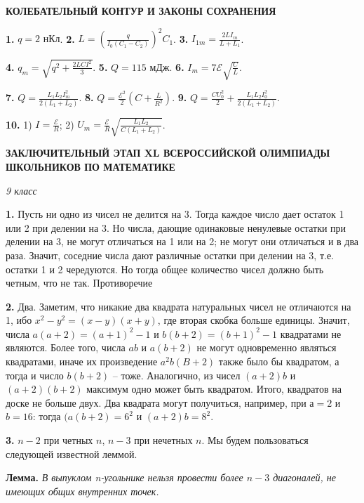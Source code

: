\begin{multicols}{2}
\begin{center}
    \textbf{КОЛЕБАТЕЛЬНЫЙ КОНТУР И ЗАКОНЫ СОХРАНЕНИЯ}
\end{center}

\textbf{1.} $q = 2\mbox{ нКл}$.
\textbf{2. }$L = (\frac{q}{I_0(C_1-C_2)})^2C_1$.
\textbf{3. }$I_{1m}=\frac{2LI_m}{L+L_1}$.

\textbf{4. }$q_m=\sqrt{q^2+\frac{2LCI^2}{3}}$.
\textbf{5. }$Q = 115\mbox{ мДж}$.
\textbf{6. }$I_m = 7\mathscr{E}\sqrt{\frac{C}{L}}$.

\textbf{7. }$Q = \frac{L_1L_2I_m^2}{2(L_1+L_2)}$.
\textbf{8. }$Q = \frac{\mathscr{E}^2}{2}(C+\frac{L}{R^2})$.
\textbf{9. }$Q = \frac{CU_0^2}{2}+\frac{L_1L_2I_0^2}{2(L_1+L_2)}$.

\textbf{10. }1) $I = \frac{\mathscr{E}}{R}$; 2) $U_m=\frac{\mathscr{E}}{R}\sqrt{\frac{L_1L_2}{C(L_1+L_2)}}$.

\columnbreak

\begin{center}
    \textbf{ЗАКЛЮЧИТЕЛЬНЫЙ ЭТАП XL ВСЕРОССИЙСКОЙ ОЛИМПИАДЫ ШКОЛЬНИКОВ ПО МАТЕМАТИКЕ}
    
    \textit{9 класс}
\end{center}

\textbf{1.} Пусть ни одно из чисел не делится на 3. Тогда каждое число дает остаток 1 или 2 при делении на 3. Но числа, дающие
одинаковые ненулевые остатки при делении на 3, не могут отличаться на 1 или на 2; не могут они отличаться и в два раза.
Значит, соседние числа дают различные остатки при делении
на 3, т.е. остатки 1 и 2 чередуются. Но тогда общее количество чисел должно быть четным, что не так. Противоречие

\textbf{2.} Два.
Заметим, что никакие два квадрата натуральных чисел не отличаются на 1, ибо $x^2-y^2=(x-y)(x+y)$, где вторая скобка больше единицы. Значит, числа $a(a+2)=(a+1)^2-1$ и $b(b+2)=(b+1)^2-1$ квадратами не являются. Более того,
числа $ab$ и $a(b+2)$ не могут одновременно являться квадратами, иначе их произведение $a^2b(B+2)$ также было бы квадратом, а тогда и число $b(b+2)$ – тоже. Аналогично, из чисел $(a+2)b$ и $(a+2)(b+2)$ максимум одно может быть квадратом. Итого, квадратов на доске не больше двух. Два квадрата могут получиться, например, при $а = 2$ и
$b = 16$: тогда $(a(b+2)=6^2$ и $(a+2)b = 8^2$.

\textbf{3.} $n-2$ при четных $n$, $n-3$ при нечетных $n$. Мы будем пользоваться следующей известной леммой.

\textbf{Лемма.} \textit{В выпуклом n-угольнике нельзя провести более $n - 3$
диагоналей, не имеющих общих внутренних точек.}


\end{multicols}
